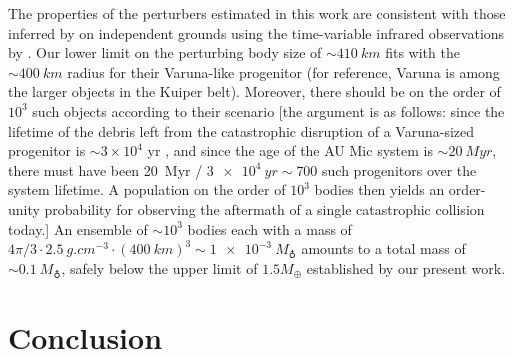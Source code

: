 \documentclass[modern]{aastex62}
\begin{document}
The properties of the perturbers estimated in this work are consistent with those inferred by \citet{chiang&fung17} on independent grounds using the time-variable infrared observations by \citet{boccaletti15,boccaletti18}. 
Our lower limit on the perturbing body size of $\sim \SI{410}{km}$ fits with the $\sim \SI{400}{km}$ radius for their Varuna-like progenitor (for reference, Varuna is among the larger objects in the Kuiper belt). 
Moreover, there should be on the order of $10^3$ such objects according to their scenario
[the argument is as follows: since the lifetime of the debris left from the catastrophic disruption of a Varuna-sized progenitor is $\sim$$3 \times 10^4$ yr \citep[][their equation 21]{chiang&fung17}, and since the age of the AU Mic system is $\sim \SI{20}{Myr}$, there must have been \SI{20}{Myr} / $ \SI{3e4}{yr} \sim 700$ such progenitors over the system lifetime. 
A population on the order of $10^3$ bodies then yields an order-unity probability for observing the aftermath of a single catastrophic collision today.] 
An ensemble of $\sim 10^3$ bodies each with a mass of $4\pi/3 \cdot \SI{2.5}{g.cm^{-3}} \cdot (\SI{400}{km})^3 \sim \SI{1e-3}{M_\earth}$ amounts to a total mass of $\sim \SI{0.1}{M_\earth}$, safely below the upper limit of $1.5 M_\oplus$ established by our present work.

\section{Conclusion}
\label{section: conclusion}
\end{document}
